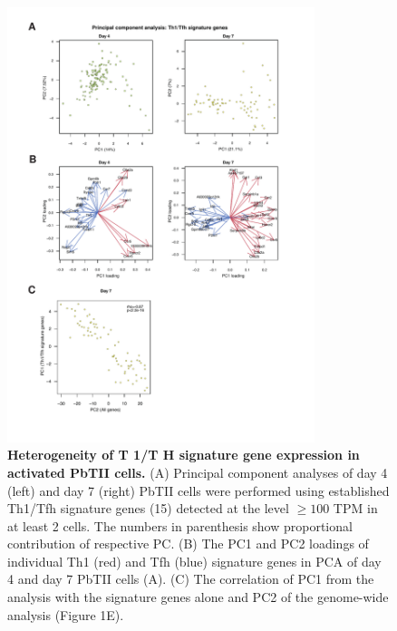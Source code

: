 \begin{figure}
    \centering
    \includegraphics[width=0.8\textwidth]{"Fig S6 rev3"}
    \caption[Heterogeneity of T 1/T H signature gene expression in activated PbTII cells]{\textbf{Heterogeneity of T 1/T H signature gene expression in activated PbTII cells.} (A) Principal component analyses of day 4 (left) and day 7 (right) PbTII cells were performed using established Th1/Tfh signature genes (15) detected at the level \( \geq 100 \) TPM in at least 2 cells. The numbers in parenthesis show proportional contribution of respective PC. (B) The PC1 and PC2 loadings of individual Th1 (red) and Tfh (blue) signature genes in PCA of day 4 and day 7 PbTII cells (A). (C) The correlation of PC1 from the analysis with the signature genes alone and PC2 of the genome-wide analysis (Figure 1E).}
    \label{fig:ms6}
\end{figure}

